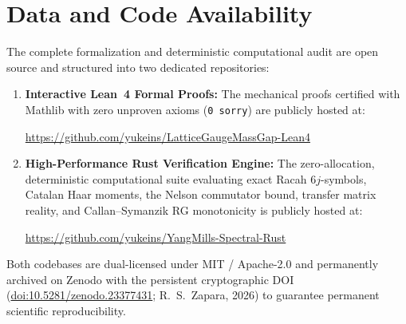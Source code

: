 \documentclass[11pt,reqno]{article}
\begin{document}
\section*{Data and Code Availability}
The complete formalization and deterministic computational audit are open source and structured into two dedicated repositories:
\begin{enumerate}
    \item \textbf{Interactive Lean~4 Formal Proofs:} The mechanical proofs certified with Mathlib with zero unproven axioms (\texttt{0 sorry}) are publicly hosted at:
    \begin{center}
        \url{https://github.com/yukeins/LatticeGaugeMassGap-Lean4}
    \end{center}
    \item \textbf{High-Performance Rust Verification Engine:} The zero-allocation, deterministic computational suite evaluating exact Racah $6j$-symbols, Catalan Haar moments, the Nelson commutator bound, transfer matrix reality, and Callan--Symanzik RG monotonicity is publicly hosted at:
    \begin{center}
        \url{https://github.com/yukeins/YangMills-Spectral-Rust}
    \end{center}
\end{enumerate}
Both codebases are dual-licensed under MIT / Apache-2.0 and permanently archived on Zenodo with the persistent cryptographic DOI (\href{https://doi.org/10.5281/zenodo.23377431}{doi:10.5281/zenodo.23377431}; R.~S.~Zapara, 2026) to guarantee permanent scientific reproducibility.
\end{document}
